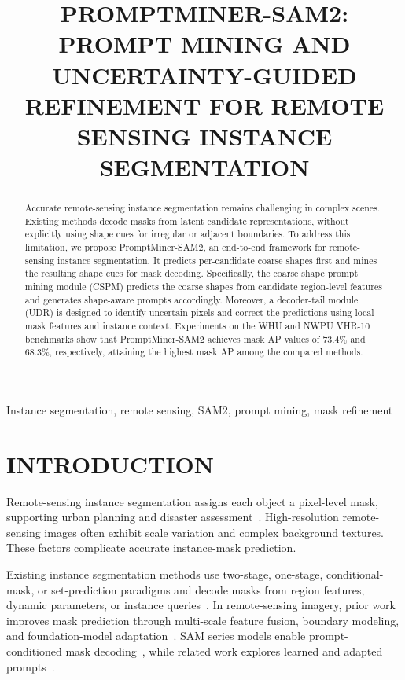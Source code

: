 \documentclass{article}
\title{PROMPTMINER-SAM2: PROMPT MINING AND UNCERTAINTY-GUIDED REFINEMENT FOR REMOTE SENSING INSTANCE SEGMENTATION}
\begin{document}
\maketitle

\begin{abstract}
Accurate remote-sensing instance segmentation remains challenging in complex scenes.
Existing methods decode masks from latent candidate representations, without explicitly using shape cues for irregular or adjacent boundaries.
To address this limitation, we propose PromptMiner-SAM2, an end-to-end framework for remote-sensing instance segmentation.
It predicts per-candidate coarse shapes first and mines the resulting shape cues for mask decoding.
Specifically, the coarse shape prompt mining module (CSPM) predicts the coarse shapes from candidate region-level features and generates shape-aware prompts accordingly.
Moreover, a decoder-tail module (UDR) is designed to identify uncertain pixels and correct the predictions using local mask features and instance context.
Experiments on the WHU and NWPU VHR-10 benchmarks show that PromptMiner-SAM2 achieves
mask AP values of 73.4\% and 68.3\%, respectively, attaining the highest mask AP among the compared
methods.
\end{abstract}
\begin{keywords}
Instance segmentation, remote sensing, SAM2, prompt mining, mask refinement
\end{keywords}

\section{INTRODUCTION}

Remote-sensing instance segmentation assigns each object a pixel-level mask, supporting urban planning and disaster assessment~\cite{rsiisn,p2pformer}.
High-resolution remote-sensing images often exhibit scale variation and complex background textures.
These factors complicate accurate instance-mask prediction.

Existing instance segmentation methods use two-stage, one-stage, conditional-mask, or set-prediction paradigms and decode masks from region features, dynamic parameters, or instance queries~\cite{maskrcnn,msrcnn,htc,condinst,mask2former}.
In remote-sensing imagery, prior work improves mask prediction through multi-scale feature fusion, boundary modeling, and foundation-model adaptation~\cite{rsiisn,p2pformer,rs4d,directsamrs}. 
SAM series models enable prompt-conditioned mask decoding~\cite{sam,sam2}, while related work explores learned and adapted prompts~\cite{rsprompter,pasam,airwaysam}.
\end{document}
